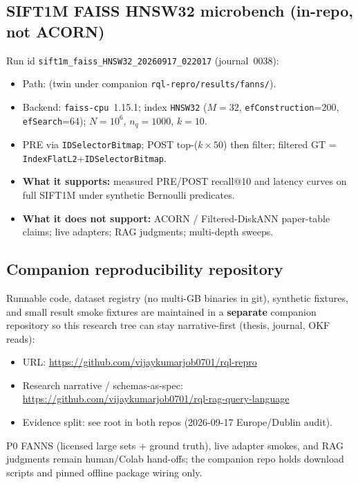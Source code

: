 \subsection{SIFT1M FAISS HNSW32 microbench (in-repo, not ACORN)}
\label{sec:repro-faiss-sift}
Run id \texttt{sift1m\_faiss\_HNSW32\_20260917\_022017} (journal~0038):
\begin{itemize}[leftmargin=*]
  \item Path:  (twin under companion \texttt{rql-repro/results/fanns/}).
  \item Backend: \texttt{faiss-cpu}~1.15.1; index \texttt{HNSW32} ($M{=}32$, \texttt{efConstruction}{=}200, \texttt{efSearch}{=}64); $N{=}10^6$, $n_q{=}1000$, $k{=}10$.
  \item PRE via \texttt{IDSelectorBitmap}; POST top-($k{\times}50$) then filter; filtered GT = \texttt{IndexFlatL2}+\texttt{IDSelectorBitmap}.
  \item \textbf{What it supports:} measured PRE/POST recall@10 and latency curves on full SIFT1M under synthetic Bernoulli predicates.
  \item \textbf{What it does not support:} ACORN / Filtered-DiskANN paper-table claims; live adapters; RAG judgments; multi-depth sweeps.
\end{itemize}

\subsection{Companion reproducibility repository}
\label{sec:repro-companion}
Runnable code, dataset registry (no multi-GB binaries in git), synthetic fixtures, and small result smoke fixtures are maintained in a \textbf{separate} companion repository so this research tree can stay narrative-first (thesis, journal, OKF reads):
\begin{itemize}[leftmargin=*]
  \item URL: \url{https://github.com/vijaykumarjob0701/rql-repro}
  \item Research narrative / schemas-as-spec: \url{https://github.com/vijaykumarjob0701/rql-rag-query-language}
  \item Evidence split: see root  in both repos (2026-09-17 Europe/Dublin audit).
\end{itemize}
P0 FANNS (licensed large sets + ground truth), live adapter smokes, and RAG judgments remain human/Colab hand-offs; the companion repo holds download scripts and pinned offline package wiring only.
